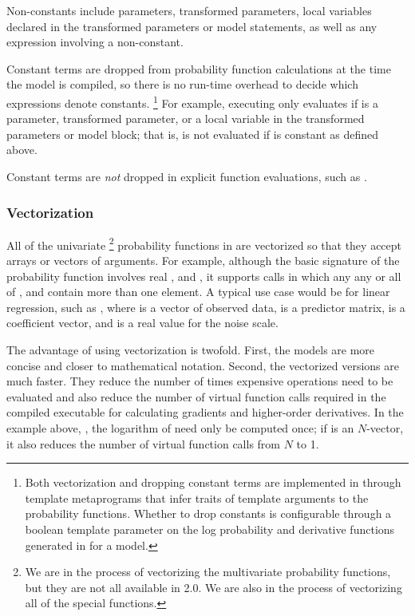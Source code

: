 \documentclass[article]{jss}
\begin{document}
Non-constants include parameters, transformed parameters, local
variables declared in the transformed parameters or model statements,
as well as any expression involving a non-constant.

Constant terms are dropped from probability function calculations at
the time the model is compiled, so there is no run-time overhead to
decide which expressions denote constants.%
%
\footnote{Both vectorization and dropping constant terms are
  implemented in  through template metaprograms that
  infer traits of template arguments to the probability functions.
  Whether to drop constants is configurable through a boolean template
  parameter on the log probability and derivative functions generated
  in  for a model.}
%
For example, executing  only evaluates
 if  is a parameter, transformed
parameter, or a local variable in the transformed parameters or model
block; that is,  is not evaluated if  is
constant as defined above.  

Constant terms are {\it not} dropped in explicit function evaluations,
such as .

\subsubsection{Vectorization}

All of the univariate%
%
\footnote{We are in the process of vectorizing the multivariate
  probability functions, but they are not all available in
   2.0.  We are also in the process of vectorizing
  all of the special functions.}
%
probability functions in  are vectorized so that they
accept arrays or vectors of arguments.  For example, although the
basic signature of the probability function
 involves real ,  and
, it supports calls in which any any or all of ,
 and  contain more than one element. A typical
use case would be for linear regression, such as , where  is a vector of observed data,
 is a predictor matrix,  is a coefficient vector,
and  is a real value for the noise scale.

The advantage of using vectorization is twofold.  First, the models
are more concise and closer to mathematical notation.  Second, the
vectorized versions are much faster.  They reduce the number of times
expensive operations need to be evaluated and also reduce the number
of virtual function calls required in the compiled 
executable for calculating gradients and higher-order derivatives.
In the example above, , the logarithm of  need only be computed
once; if  is an $N$-vector, it also reduces the number of
virtual function calls from $N$ to 1.
\end{document}
